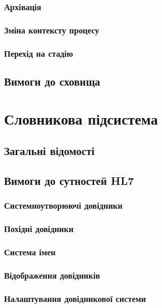 \subsubsection{Архівація}

\subsubsection{Зміна контексту процесу}

\subsubsection{Перехід на стадію}

\subsection{Вимоги до сховища}

\newpage
\section{Словникова підсистема}

\subsection{Загальні відомості}

\subsection{Вимоги до сутностей HL7}

\subsubsection{Системноутворюючі довідники}

\subsubsection{Похідні довідники}

\subsubsection{Система імен}

\subsubsection{Відображення довідників}

\subsubsection{Налаштування довідникової системи}

